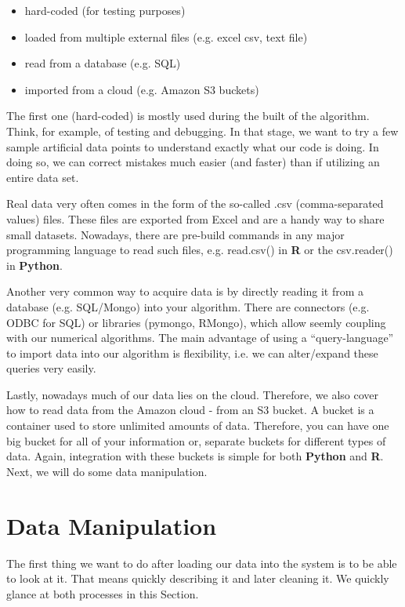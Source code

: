 \begin{itemize}
\item hard-coded (for testing purposes)
\item loaded from multiple external files (e.g. excel csv, text file)
\item read from a database (e.g. SQL)
\item imported from a cloud (e.g. Amazon S3 buckets)
\end{itemize}

The first one (hard-coded) is mostly used during the built of the algorithm. Think, for example, of testing and debugging. In that stage, we want to try a few sample artificial data points to understand exactly what our code is doing. In doing so, we can correct mistakes much easier (and faster) than if utilizing an entire data set. 

Real data very often comes in the form of the so-called .csv (comma-separated values) files. These files are exported from Excel and are a handy way to share small datasets. Nowadays, there are pre-build commands in any major programming language to read such files, e.g. read.csv() in \textbf{R} or the csv.reader() in \textbf{Python}.

Another very common way to acquire data is by directly reading it from a database (e.g. SQL/Mongo) into your algorithm. There are connectors (e.g. ODBC for SQL) or libraries (pymongo, RMongo), which allow seemly coupling with our numerical algorithms. The main advantage of using a ``query-language'' to import data into our algorithm is flexibility, i.e. we can alter/expand these queries very easily.

Lastly, nowadays much of our data lies on the cloud. Therefore, we also cover how to read data from the Amazon cloud - from an S3 bucket. A bucket is a container used to store unlimited amounts of data. Therefore, you can have one big bucket for all of your information or, separate buckets for different types of data. Again, integration with these buckets is simple for both \textbf{Python} and \textbf{R}. Next, we will do some data manipulation.

\section{Data Manipulation}\label{dataM} 

The first thing we want to do after loading our data into the system is to be able to look at it. That means quickly describing it and later cleaning it. We quickly glance at both processes in this Section.

